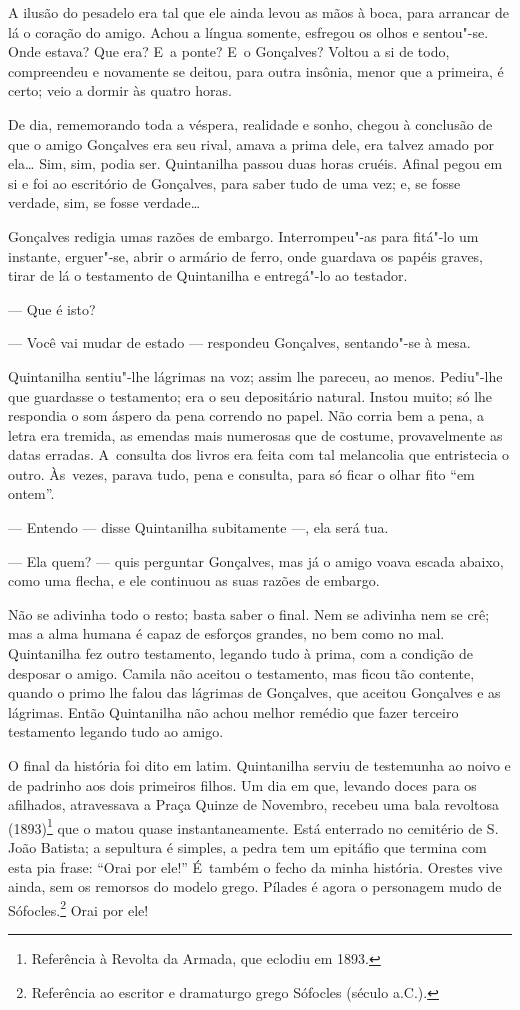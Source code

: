 \begin{linenumbers}
A ilusão do pesadelo era tal que ele ainda levou as mãos à boca, para
arrancar de lá o coração do amigo. Achou a língua somente, esfregou os
olhos e sentou"-se. Onde estava? Que era? E~a ponte? E~o Gonçalves?
Voltou a si de todo, compreendeu e novamente se deitou, para outra
insônia, menor que a primeira, é certo; veio a dormir às quatro horas.

De dia, rememorando toda a véspera, realidade e sonho, chegou à
conclusão de que o amigo Gonçalves era seu rival, amava a prima dele,
era talvez amado por ela\ldots{} Sim, sim, podia ser. Quintanilha passou duas
horas cruéis. Afinal pegou em si e foi ao escritório de Gonçalves, para
saber tudo de uma vez; e, se fosse verdade, sim, se fosse verdade\ldots{}

Gonçalves redigia umas razões de embargo. Interrompeu"-as para fitá"-lo um
instante, erguer"-se, abrir o armário de ferro, onde guardava os papéis
graves, tirar de lá o testamento de Quintanilha e entregá"-lo ao
testador.

--- Que é isto?

--- Você vai mudar de estado --- respondeu Gonçalves, sentando"-se à mesa.

Quintanilha sentiu"-lhe lágrimas na voz; assim lhe pareceu, ao menos.
Pediu"-lhe que guardasse o testamento; era o seu depositário natural.
Instou muito; só lhe respondia o som áspero da pena correndo no papel.
Não corria bem a pena, a letra era tremida, as emendas mais numerosas
que de costume, provavelmente as datas erradas. A~consulta dos livros
era feita com tal melancolia que entristecia o outro. Às~vezes, parava
tudo, pena e consulta, para só ficar o olhar fito ``em ontem''.

--- Entendo --- disse Quintanilha subitamente ---, ela será tua.

--- Ela quem? --- quis perguntar Gonçalves, mas já o amigo voava escada
abaixo, como uma flecha, e ele continuou as suas razões de embargo.

Não se adivinha todo o resto; basta saber o final. Nem se adivinha nem
se crê; mas a alma humana é capaz de esforços grandes, no bem como no
mal. Quintanilha fez outro testamento, legando tudo à prima, com a
condição de desposar o amigo. Camila não aceitou o testamento, mas ficou
tão contente, quando o primo lhe falou das lágrimas de Gonçalves, que
aceitou Gonçalves e as lágrimas. Então Quintanilha não achou melhor
remédio que fazer terceiro testamento legando tudo ao amigo.

O final da história foi dito em latim. Quintanilha serviu de testemunha
ao noivo e de padrinho aos dois primeiros filhos. Um dia em que, levando
doces para os afilhados, atravessava a Praça Quinze de Novembro, recebeu
uma bala revoltosa (1893)\footnote{Referência à Revolta da Armada, que
  eclodiu em 1893.} que o matou quase instantaneamente. Está enterrado
no cemitério de S.\,João Batista; a sepultura é simples, a pedra tem um
epitáfio que termina com esta pia frase: ``Orai por ele!'' É~também o
fecho da minha história. Orestes vive ainda, sem os remorsos do modelo
grego. Pílades é agora o personagem mudo de Sófocles.\footnote{Referência
  ao escritor e dramaturgo grego Sófocles (século  a.C.).} Orai por
ele!


\end{linenumbers}
